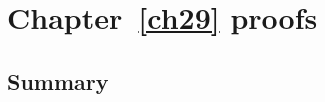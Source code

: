 \chapter{Chapter~\ref{ch29} proofs}

\newpage
\section{Summary}\label{ch29.ps.summary}
\lpscriptsummary
